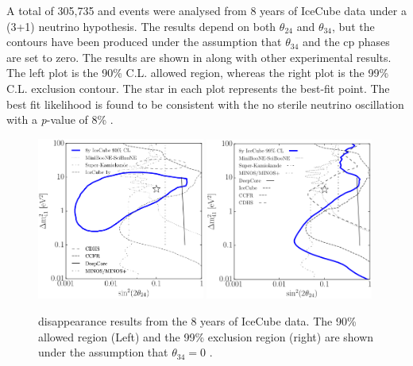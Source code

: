 A total of 305,735 \numu and \numubar events were analysed from 8 years of IceCube data under a (3+1) neutrino hypothesis. The results depend on both $\theta_{24}$ and $\theta_{34}$, but the contours have been produced under the assumption that $\theta_{34}$ and the \gls{cp} phases are set to zero. The results are shown in  along with other experimental results. The left plot is the 90\% C.L. allowed region, whereas the right plot is the 99\% C.L. exclusion contour. The star in each plot represents the best-fit point. The best fit likelihood is found to be consistent with the no sterile neutrino oscillation with a \textit{p}-value of 8\% \cite{IceCube_numu_disapp_contour}.



\begin{figure}[h!]
    \centering
    \includegraphics[width = 0.49\textwidth]{figures-chap6/external_limits/numu_disapp_icecube_90pct.png}
    \includegraphics[width = 0.49\textwidth]{figures-chap6/external_limits/numu_disapp_icecube_99pct.png}
    \caption[\nue disappearance limits from the IceCube experiment.]{\numu disappearance results from the 8 years of IceCube data. The 90\% allowed region (Left) and the 99\% exclusion region (right) are shown under the assumption that $\theta_{34} = 0$ \cite{IceCube_numu_disapp_contour}.}
    \label{fig:icecube}
\end{figure}

